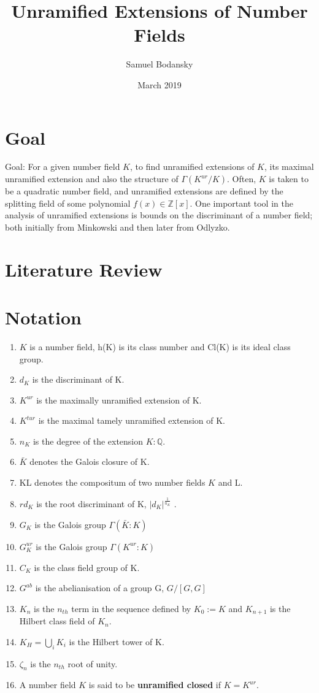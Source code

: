 \documentclass[12pt]{extarticle}
\title{Unramified Extensions of Number Fields}
\author{Samuel Bodansky}
\date{March 2019}
\newcommand{\Q}{\mathbb{Q}}
\newcommand{\Z}{\mathbb{Z}}
\newcommand{\<}{\langle}
\renewcommand{\>}{\rangle}
\theoremstyle{definition}
\begin{document}
\maketitle
\section{Goal}
Goal: For a given number field $K$, to find unramified extensions of $K$, its maximal unramified extension and also the structure of $\Gamma(K^{ur}/K)$. Often, $K$ is taken to be a quadratic number field, and unramified extensions are defined by the splitting field of some polynomial $f(x) \in \Z[x]$. One important tool in the analysis of unramified extensions is bounds on the discriminant of a number field; both initially from Minkowski and then later from Odlyzko. 


\section{Literature Review}

\section{Notation}
\begin{enumerate}
    \item $K$ is a number field, h(K) is its class number and Cl(K) is its ideal class group.
    \item $d_K$ is the discriminant of K.
    \item $K^{ur}$ is the maximally unramified extension of K.
    \item $K^{tur}$ is the maximal tamely unramified extension of K.
    \item $n_K$ is the degree of the extension $K:\Q$.
    \item $\bar{K}$ denotes the Galois closure of K.
    \item KL denotes the compositum of two number fields $K$ and L.
    \item $rd_K$ is the root discriminant of K, $|d_K|^\frac{1}{n_K}$ .
    \item $G_K$ is the Galois group $\Gamma(\bar{K}:K)$
    \item $G_K^{ur}$ is the Galois group $\Gamma(K^{ur}:K)$
    \item $C_K$ is the class field group of K. 
    \item $G^{ab}$ is the abelianisation of a group G, $G/[G,G]$
    \item $K_n$ is the $n_{th}$ term in the sequence defined by $K_0:=K$ and $K_{n+1}$ is the Hilbert class field of $K_n$.
    \item $K_H=\bigcup_{i}K_{i}$ is the Hilbert tower of K.  
    \item $\zeta_n$ is the $n_{th}$ root of unity. 
    \item A number field $K$ is said to be \textbf{unramified closed} if $K = K^{ur}$.
\end{enumerate}
\end{document}
